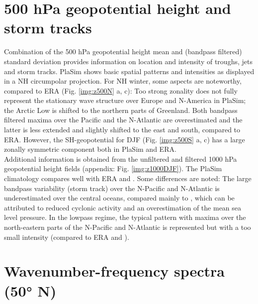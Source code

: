 \documentclass[12pt,a4paper,twoside,openright,headinclude,liststotoc,bibtotoc]{scrreprt}
\begin{document}
\section{500 hPa geopotential height and storm tracks}
\vspace{-0.4cm}

Combination of the 500 hPa geopotential height mean and (bandpass filtered) standard deviation provides information on location and intensity of troughs, jets and storm tracks. PlaSim shows basic spatial patterns and intensities as displayed in a NH circumpolar projection. For NH winter, some aspects are noteworthy, compared to ERA (Fig. \ref{img:z500N} a, c): Too strong zonality does not fully represent the stationary wave structure over Europe and N-America in PlaSim; the Arctic Low is shifted to the northern parts of Greenland. Both bandpass filtered maxima over the Pacific and the N-Atlantic are overestimated and the latter is less extended and slightly shifted to the east and south, compared to ERA. However, the  SH-geopotential for DJF (Fig. \ref{img:z500S} a, c) has a large zonally symmetric component both in PlaSim and ERA.\\
Additional information is obtained from the unfiltered and filtered 1000 hPa geopotential height fields (appendix: Fig. \ref{img:z1000DJF}). The PlaSim climatology compares well with ERA and \citet[p. 82]{Roeckner1996}. Some differences are noted: The large bandpass variability (storm track) over the N-Pacific and N-Atlantic is underestimated over the central oceans, compared mainly to \citet[p. 82]{Roeckner1996}, which can be attributed to reduced cyclonic activity and an overestimation of the mean sea level pressure. In the lowpass regime, the typical pattern with maxima over the north-eastern parts of the N-Pacific and N-Atlantic is represented but with a too small intensity (compared to ERA and \citet{Roeckner1996}).


\vspace{-0.4cm}
\section{Wavenumber-frequency spectra (50° N)}
\vspace{-0.4cm}
\end{document}
